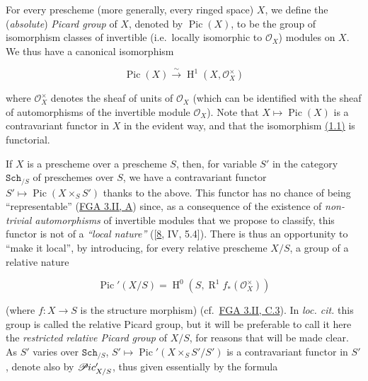 \documentclass{article}
\newenvironment{eqenv}
  {}
  {}
\newcommand{\oldpage}[1]{\marginpar{\footnotesize$\Big\vert$ \textit{p.~#1}}}
\theoremstyle{definition}
\theoremstyle{definition}
\theoremstyle{definition}
\theoremstyle{definition}
\theoremstyle{remark}
\begin{document}
\oldpage{232-01}For every prescheme (more generally, every ringed space) \(X\), we define the (\emph{absolute}) \emph{Picard group} of \(X\), denoted by \(\operatorname{Pic}(X)\), to be the group of isomorphism classes of invertible (i.e.~locally isomorphic to \({\mathscr{O}}_X\)) modules on \(X\).
We thus have a canonical isomorphism

\leavevmode{}%
\begin{eqenv}
\[
  \operatorname{Pic}(X)
  \xrightarrow{\sim}\operatorname{H}^1(X,{\mathscr{O}}_X^\times)
\tag{1.1}
\]

\end{eqenv}

where \({\mathscr{O}}_X^\times\) denotes the sheaf of units of \({\mathscr{O}}_X\) (which can be identified with the sheaf of automorphisms of the invertible module \({\mathscr{O}}_X\)).
Note that \(X\mapsto\operatorname{Pic}(X)\) is a contravariant functor in \(X\) in the evident way, and that the isomorphism \protect\hyperlink{fga-3-v-equation-1.1}{(1.1)} is functorial.

If \(X\) is a prescheme over a prescheme \(S\), then, for variable \(S'\) in the category \(\mathtt{Sch}_{/S}\) of preschemes over \(S\), we have a contravariant functor \(S'\mapsto\operatorname{Pic}(X\times_S S')\) thanks to the above.
This functor has no chance of being ``representable'' (\protect\hyperlink{fga-3-ii-section-A.1}{FGA 3.II, A}) since, as a consequence of the existence of \emph{non-trivial automorphisms} of invertible modules that we propose to classify, this functor is not of a \emph{``local nature''} ({[}\protect\hyperlink{ref-Gro1960a}{8}, IV, 5.4{]}).
There is thus an opportunity to ``make it local'', by introducing, for every relative prescheme \(X/S\), a group of a relative nature

\leavevmode{}%
\begin{eqenv}
\[
  \operatorname{Pic}'(X/S)
  = \operatorname{H}^0(S,\operatorname{R}^1f_*({\mathscr{O}}_X^\times))
\tag{1.2}
\]

\end{eqenv}

(where \(f\colon X\to S\) is the structure morphism) (cf.~\protect\hyperlink{fga-3-ii-section-C.3}{FGA 3.II, C.3}).
In \emph{loc. cit.} this group is called the relative Picard group, but it will be preferable to call it here the \emph{restricted relative Picard group} of \(X/S\), for reasons that will be made clear.
As \(S'\) varies over \(\mathtt{Sch}_{/S}\), \(S'\mapsto\operatorname{Pic}'(X\times_S S'/S')\) is a contravariant functor in \(S'\), denote also by \(\mathscr{P}\kern -.5pt ic'_{X/S}\), thus given essentially by the formula
\end{document}

